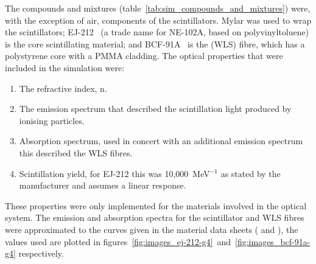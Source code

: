The compounds and mixtures (table~\ref{tab:sim_compounds_and_mixtures}) were, with the exception of air, components of the scintillators. Mylar was used to wrap the scintillators; EJ-212~\cite{ej_212} (a trade name for NE-102A, based on polyvinyltoluene) is the core scintillating material; and BCF-91A~\cite{bcf_91a} is the (WLS) fibre, which has a polystyrene core with a PMMA cladding. The optical properties that were included in the simulation were:
\begin{enumerate}
  \item The refractive index, n.
  \item The emission spectrum that described the scintillation light produced by ionising particles.
  \item Absorption spectrum, used in concert with an additional emission spectrum this described the WLS fibres.
  \item Scintillation yield, for EJ-212 this was 10,000~MeV\(^{-1}\) as stated by the manufacturer and assumes a linear response.
\end{enumerate}
These properties were only implemented for the materials involved in the optical system. The emission and absorption spectra for the scintillator and WLS fibres were approximated to the curves given in the material data sheets (\cite{ej_212} and \cite{bcf_91a}), the values used are plotted in figures~\ref{fig:images_ej-212-g4}~and~\ref{fig:images_bcf-91a-g4} respectively.

